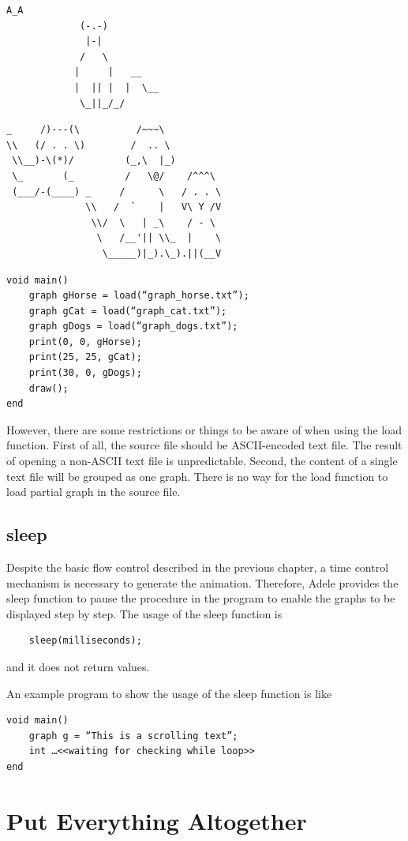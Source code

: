 \documentclass[11pt,letterpaper]{article}
\begin{document}
\begin{lstlisting}[caption=graph\_cat.txt, label=cat, captionpos=b]
			  A_A
			 (-.-)
			  |-|
			 /   \
			|     |   __
			|  || |  |  \__
			 \_||_/_/
\end{lstlisting}

\begin{lstlisting}[caption=graph\_dogs.txt, label=dogs, captionpos=b]
_     /)---(\          /~~~\
\\   (/ . . \)        /  .. \
 \\__)-\(*)/         (_,\  |_)
 \_       (_         /   \@/    /^^^\
 (___/-(____) _     /      \   / . . \
              \\   /  `    |   V\ Y /V
               \\/  \   | _\    / - \
                \   /__'|| \\_  |    \
                 \_____)|_).\_).||(__V
\end{lstlisting}

\begin{lstlisting}[caption=animals.adl, label=animal, captionpos=b]
void main()
	graph gHorse = load(“graph_horse.txt”);
	graph gCat = load(“graph_cat.txt”);
	graph gDogs = load(“graph_dogs.txt”);
	print(0, 0, gHorse);
	print(25, 25, gCat);
	print(30, 0, gDogs);
	draw();
end
\end{lstlisting}

However, there are some restrictions or things to be aware of when using the load function. First of all, the source file should be ASCII-encoded text file. The result of opening a non-ASCII text file is unpredictable. Second, the content of a single text file will be grouped as one graph. There is no way for the load function to load partial graph in the source file.

\subsection {sleep}

Despite the basic flow control described in the previous chapter, a time control mechanism is necessary to generate the animation. Therefore, Adele provides the sleep function to pause the procedure in the program to enable the graphs to be displayed step by step. The usage of the sleep function is
\begin{lstlisting}
	sleep(milliseconds);
\end{lstlisting}
and it does not return values.

An example program to show the usage of the sleep function is like

\begin{lstlisting}[caption=marquee.adl, label=marquee, captionpos=b]
void main()
	graph g = “This is a scrolling text”;
	int …<<waiting for checking while loop>>
end
\end{lstlisting}

\section {Put Everything Altogether}
\end{document}

